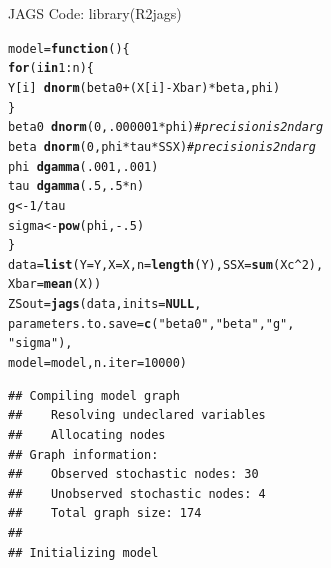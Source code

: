 \documentclass[handout]{beamer}\usepackage[]{graphicx}\usepackage[]{color}
\makeatletter
\newcommand{\hlnum}[1]{\textcolor[rgb]{0.686,0.059,0.569}{#1}}%
\newcommand{\hlstr}[1]{\textcolor[rgb]{0.192,0.494,0.8}{#1}}%
\newcommand{\hlcom}[1]{\textcolor[rgb]{0.678,0.584,0.686}{\textit{#1}}}%
\newcommand{\hlopt}[1]{\textcolor[rgb]{0,0,0}{#1}}%
\newcommand{\hlstd}[1]{\textcolor[rgb]{0.345,0.345,0.345}{#1}}%
\newcommand{\hlkwa}[1]{\textcolor[rgb]{0.161,0.373,0.58}{\textbf{#1}}}%
\newcommand{\hlkwb}[1]{\textcolor[rgb]{0.69,0.353,0.396}{#1}}%
\newcommand{\hlkwc}[1]{\textcolor[rgb]{0.333,0.667,0.333}{#1}}%
\newcommand{\hlkwd}[1]{\textcolor[rgb]{0.737,0.353,0.396}{\textbf{#1}}}%
\newenvironment{kframe}{%
 \def\at@end@of@kframe{}%
 \ifinner\ifhmode%
  \def\at@end@of@kframe{\end{minipage}}%
  \begin{minipage}{\columnwidth}%
 \fi\fi%
 \def\FrameCommand##1{\hskip\@totalleftmargin \hskip-\fboxsep
 \colorbox{shadecolor}{##1}\hskip-\fboxsep
     \hskip-\linewidth \hskip-\@totalleftmargin \hskip\columnwidth}%
 \MakeFramed {\advance\hsize-\width
   \@totalleftmargin\z@ \linewidth\hsize
   \@setminipage}}%
 {\par\unskip\endMakeFramed%
 \at@end@of@kframe}
\newenvironment{knitrout}{}{} %
\makeatother
\begin{document}
\begin{frame}[fragile]{JAGS Code: library(R2jags)}
\begin{knitrout}
\color{fgcolor}\begin{kframe}
\begin{alltt}
\hlstd{model} \hlkwb{=} \hlkwa{function}\hlstd{()\{}
  \hlkwa{for} \hlstd{(i} \hlkwa{in} \hlnum{1}\hlopt{:}\hlstd{n) \{}
      \hlstd{Y[i]} \hlopt{~} \hlkwd{dnorm}\hlstd{(beta0}\hlopt{+} \hlstd{(X[i]} \hlopt{-}\hlstd{Xbar)}\hlopt{*}\hlstd{beta, phi)}
  \hlstd{\}}
  \hlstd{beta0} \hlopt{~} \hlkwd{dnorm}\hlstd{(}\hlnum{0}\hlstd{,} \hlnum{.000001}\hlopt{*}\hlstd{phi)} \hlcom{#precision is 2nd arg}
  \hlstd{beta} \hlopt{~} \hlkwd{dnorm}\hlstd{(}\hlnum{0}\hlstd{, phi}\hlopt{*}\hlstd{tau}\hlopt{*}\hlstd{SSX)}  \hlcom{#precision is 2nd arg}
  \hlstd{phi} \hlopt{~} \hlkwd{dgamma}\hlstd{(}\hlnum{.001}\hlstd{,} \hlnum{.001}\hlstd{)}
  \hlstd{tau} \hlopt{~} \hlkwd{dgamma}\hlstd{(}\hlnum{.5}\hlstd{,} \hlnum{.5}\hlopt{*}\hlstd{n)}
  \hlstd{g} \hlkwb{<-} \hlnum{1}\hlopt{/}\hlstd{tau}
  \hlstd{sigma} \hlkwb{<-} \hlkwd{pow}\hlstd{(phi,} \hlopt{-}\hlnum{.5}\hlstd{)}
\hlstd{\}}
\hlstd{data} \hlkwb{=} \hlkwd{list}\hlstd{(}\hlkwc{Y}\hlstd{=Y,} \hlkwc{X}\hlstd{=X,} \hlkwc{n} \hlstd{=}\hlkwd{length}\hlstd{(Y),} \hlkwc{SSX}\hlstd{=}\hlkwd{sum}\hlstd{(Xc}\hlopt{^}\hlnum{2}\hlstd{),}
            \hlkwc{Xbar}\hlstd{=}\hlkwd{mean}\hlstd{(X))}
\hlstd{ZSout} \hlkwb{=} \hlkwd{jags}\hlstd{(data,} \hlkwc{inits}\hlstd{=}\hlkwa{NULL}\hlstd{,}
             \hlkwc{parameters.to.save}\hlstd{=}\hlkwd{c}\hlstd{(}\hlstr{"beta0"}\hlstd{,}\hlstr{"beta"}\hlstd{,} \hlstr{"g"}\hlstd{,}
                                  \hlstr{"sigma"}\hlstd{),}
             \hlkwc{model}\hlstd{=model,} \hlkwc{n.iter}\hlstd{=}\hlnum{10000}\hlstd{)}
\end{alltt}


{\ttfamily\noindent\itshape\color{messagecolor}{\#\# module glm loaded}}\begin{verbatim}
## Compiling model graph
##    Resolving undeclared variables
##    Allocating nodes
## Graph information:
##    Observed stochastic nodes: 30
##    Unobserved stochastic nodes: 4
##    Total graph size: 174
## 
## Initializing model
\end{verbatim}
\end{kframe}
\end{knitrout}
\end{frame}
\end{document}
